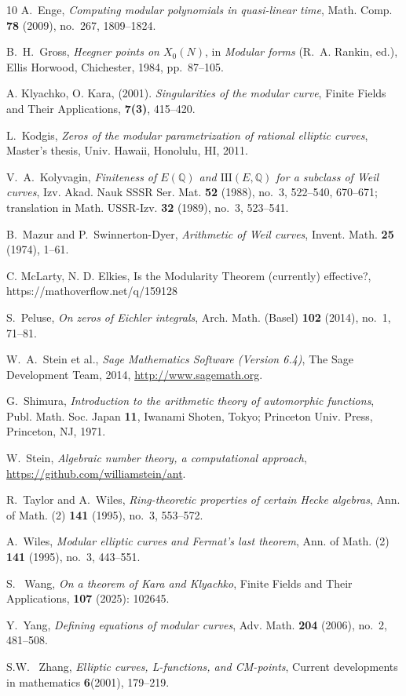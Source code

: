 \documentclass[10pt, a4paper]{article}
\begin{document}
\begin{thebibliography}{10}
A.~Enge,
\emph{Computing modular polynomials in quasi-linear time},
Math. Comp. \textbf{78} (2009), no.~267, 1809--1824.

B.~H.~Gross,
\emph{Heegner points on $X_0(N)$},
in \emph{Modular forms} (R.~A. Rankin, ed.),
Ellis Horwood, Chichester, 1984, pp.~87--105.

A. Klyachko,  O. Kara,  (2001).  \emph{Singularities of the modular curve},
 Finite Fields and Their Applications,  \textbf{7(3)}, 415--420.

L.~Kodgis,
\emph{Zeros of the modular parametrization of rational elliptic curves},
Master's thesis, Univ. Hawaii, Honolulu, HI, 2011.

V.~A.~Kolyvagin,
\emph{Finiteness of $E(\mathbb{Q})$ and $\text{III}(E,\mathbb{Q})$ for a subclass of Weil curves},
Izv. Akad. Nauk SSSR Ser. Mat. \textbf{52} (1988), no.~3, 522--540, 670--671;
translation in Math. USSR-Izv. \textbf{32} (1989), no.~3, 523--541.

B.~Mazur and P.~Swinnerton-Dyer,
\emph{Arithmetic of Weil curves},
Invent. Math. \textbf{25} (1974), 1--61.

C.  McLarty, N. D. Elkies,  Is the Modularity Theorem (currently) effective?,
https://mathoverflow.net/q/159128

S.~Peluse,
\emph{On zeros of Eichler integrals},
Arch. Math. (Basel) \textbf{102} (2014), no.~1, 71--81.

W.~A.~Stein et al.,
\emph{Sage Mathematics Software (Version 6.4)},
The Sage Development Team, 2014,
\url{http://www.sagemath.org}.

G.~Shimura,
\emph{Introduction to the arithmetic theory of automorphic functions},
Publ. Math. Soc. Japan \textbf{11},
Iwanami Shoten, Tokyo; Princeton Univ. Press, Princeton, NJ, 1971.

W.~Stein,
\emph{Algebraic number theory, a computational approach},
\url{https://github.com/williamstein/ant}.

R.~Taylor and A.~Wiles,
\emph{Ring-theoretic properties of certain Hecke algebras},
Ann. of Math. (2) \textbf{141} (1995), no.~3, 553--572.

A.~Wiles,
\emph{Modular elliptic curves and Fermat's last theorem},
Ann. of Math. (2) \textbf{141} (1995), no.~3, 443--551.

S. ~Wang,  \emph{On a theorem of Kara and Klyachko},
 Finite Fields and Their Applications,  \textbf{107} (2025): 102645. 

Y.~Yang,
\emph{Defining equations of modular curves},
Adv. Math. \textbf{204} (2006), no.~2, 481--508.

S.W. ~Zhang, \emph{Elliptic curves, L-functions, and CM-points},  Current developments in mathematics \textbf{6}(2001), 179--219.

\end{thebibliography}
\end{document}
